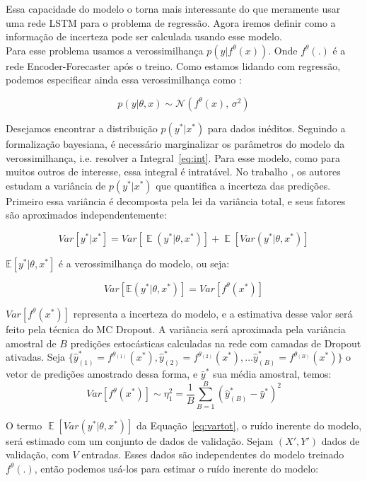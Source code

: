 Essa capacidade do modelo o torna mais interessante do que meramente usar uma
rede LSTM para o problema de regressão. Agora iremos definir como a informação
de incerteza pode ser calculada usando esse modelo. \\

Para esse problema usamos a verossimilhança $p(y |f^\theta(x))$.
Onde $f^\theta(.)$ é a rede Encoder-Forecaster após o treino.
Como estamos lidando com regressão, podemos especificar ainda essa verossimilhança
como \citep{ubertime}:  

\begin{equation}
  \label{eq:reg}
 p(y| \theta,x) \sim \mathcal{N}(f^{\theta}(x),\,\sigma^2)
\end{equation}

Desejamos encontrar a distribuição $p(y^*| x^*)$ para dados inéditos. Seguindo
a formalização bayesiana, é necessário marginalizar os parâmetros do modelo da
verossimilhança, i.e. resolver a Integral~\ref{eq:int}. Para esse modelo, como
para muitos outros de interesse, essa integral é intratável. No trabalho
\citep{ubertime}, os autores estudam a variância de $p(y^{*} | x^{*})$ que
quantifica a incerteza das predições. Primeiro essa variância é decomposta pela
lei da variância total, e seus fatores são aproximados independentemente: 

\begin{equation}
   Var[y^* | x^*] = Var[\mathop{\mathbb{E}}(y^* | \theta,x^*)] + \mathop{\mathbb{E}}[Var(y^* | \theta,x^*)]
   \label{eq:vartot}
 \end{equation}

$\mathbb{E}[y^* | \theta,x^*]$ é a verossimilhança do modelo, ou seja:

\[
  Var[\mathbb{E}(y^* | \theta,x^*)] = Var[f^\theta(x^*)]
\]

$Var[f^\theta(x^*)]$ representa a incerteza do modelo, e a estimativa desse valor será feito pela técnica do MC Dropout. A variância
será aproximada pela variância amostral de $B$ predições estocásticas calculadas
na rede com camadas de Dropout ativadas. Seja $\{\hat{y}^*_{(1)}=f^{\theta_{(1)}}(x^*),\hat{y}^*_{(2)}=f^{\theta_{(2)}}(x^*), \dots
\hat{y}^*_{(B)}=f^{\theta_{(B)}}(x^*)\}$ o vetor de predições amostrado dessa forma, e $\bar{y}^*$ sua
média amostral, temos: \\

\[   Var[f^\theta(x^*)] \sim \eta_1^2 = \frac{1}{B}\sum^B_{B=1}(\hat{y}^*_{(B)} - \bar{y}^*)^2  \]

O termo $\mathop{\mathbb{E}}[Var(y^* | \theta,x^*)]$ da Equação~\ref{eq:vartot}, o
ruído inerente do modelo, será estimado com um conjunto de dados de validação.
Sejam $(X',Y')$ dados de validação, com
$V$ entradas. Esses dados são independentes do modelo
treinado $f^\theta(.)$, então podemos usá-los para estimar o ruído inerente do
modelo: \\

